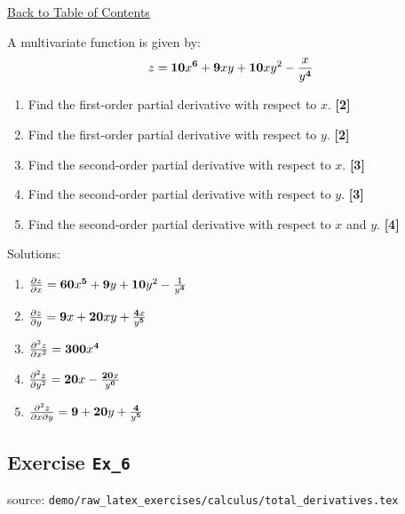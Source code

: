 \documentclass[a4paper, leqno, 12pt]{report}
\newenvironment{top_enumerate}{
\begin{enumerate}
  \setlength{\itemsep}{2em}
  \setlength{\topsep}{-0pt}
  \setlength{\partopsep}{-0pt}
}{\end{enumerate}}
\begin{document}
\hyperlink{contents}{Back to Table of Contents}
\begin{top_enumerate}
\item A multivariate function is given by:
\[
z = {\bf 10}x^{\bf 6} + {\bf 9}xy + {\bf 10}xy^2 - \frac{x}{y^{\bf 4}}
\]
 
\setcounter{equation}{0}  %
\begin{enumerate}
	\setlength{\topsep}{-0pt}
	\setlength{\partopsep}{-0pt}
	\setlength{\itemsep}{10pt}
			\item Find the first-order partial derivative with respect to $x$.
	 \quad \textbf{[2]}
		\item Find the first-order partial derivative with respect to $y$.
	 \quad \textbf{[2]}
		\item Find the second-order partial derivative with respect to $x$.
	 \quad \textbf{[3]}
		\item Find the second-order partial derivative with respect to $y$.
	 \quad \textbf{[3]}
		\item Find the second-order partial derivative with respect to $x$ and $y$.
	 \quad \textbf{[4]}
\end{enumerate}\addtocounter{enumi}{-1}
\item Solutions:
 
\setcounter{equation}{0}  %
\begin{enumerate}
	\setlength{\topsep}{-0pt}
	\setlength{\partopsep}{-0pt}
	\setlength{\itemsep}{10pt}
			\item $\frac{\partial z}{\partial x}={{\bf 60}x^{\bf 5} + {\bf 9}y + {\bf 10}y^2 - \frac{1}{y^{\bf 4}}}$
	 \quad \textbf{}
		\item $\frac{\partial z}{\partial y}={{\bf 9}x + {\bf 20}xy + \frac{{\bf 4}x}{y^{\bf 5}}}$
	 \quad \textbf{}
		\item $\frac{\partial^2 z}{\partial x^2}={{\bf 300}x^{\bf 4}}$
	 \quad \textbf{}
		\item $\frac{\partial^2 z}{\partial y^2}={{\bf 20}x - \frac{{\bf 20}x}{y^{\bf 6}}}$
	 \quad \textbf{}
		\item $\frac{\partial^2 z}{\partial x \partial y}={{\bf 9} + {\bf 20}y + \frac{{\bf 4}}{y^{\bf 5}}}$
	 \quad \textbf{}
\end{enumerate}\newpage
\end{top_enumerate}
\subsection{Exercise \texttt{Ex\_6}}
source: \texttt{demo/raw\_latex\_exercises/calculus/total\_derivatives.tex}
\end{document}
